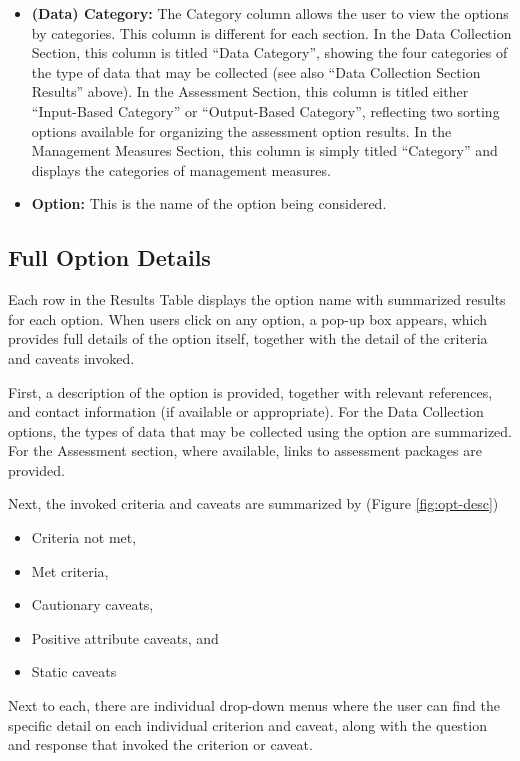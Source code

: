 \documentclass[
  11pt,
]{book}
\providecommand{\tightlist}{%
  \setlength{\itemsep}{0pt}\setlength{\parskip}{0pt}}
\begin{document}
\begin{itemize}
\item
  \textbf{(Data) Category:} The Category column allows the user to view the options by categories. This column is different for each section. In the Data Collection Section, this column is titled ``Data Category'', showing the four categories of the type of data that may be collected (see also ``Data Collection Section Results'' above). In the Assessment Section, this column is titled either ``Input-Based Category'' or ``Output-Based Category'', reflecting two sorting options available for organizing the assessment option results. In the Management Measures Section, this column is simply titled ``Category'' and displays the categories of management measures.
\item
  \textbf{Option:} This is the name of the option being considered.
\end{itemize}

\hypertarget{full-option-details}{%
\subsection{Full Option Details}\label{full-option-details}}

Each row in the Results Table displays the option name with summarized results for each option. When users click on any option, a pop-up box appears, which provides full details of the option itself, together with the detail of the criteria and caveats invoked.

First, a description of the option is provided, together with relevant references, and contact information (if available or appropriate). For the Data Collection options, the types of data that may be collected using the option are summarized. For the Assessment section, where available, links to assessment packages are provided.

Next, the invoked criteria and caveats are summarized by (Figure \ref{fig:opt-desc})

\begin{itemize}
\tightlist
\item
  Criteria not met,
\item
  Met criteria,
\item
  Cautionary caveats,
\item
  Positive attribute caveats, and
\item
  Static caveats
\end{itemize}

Next to each, there are individual drop-down menus where the user can find the specific detail on each individual criterion and caveat, along with the question and response that invoked the criterion or caveat.
\end{document}

